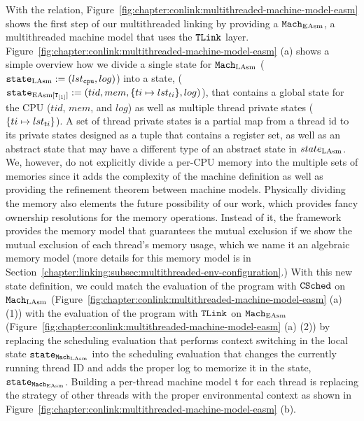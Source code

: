 With the relation, 
Figure~\ref{fig:chapter:conlink:multithreaded-machine-model-easm} shows
the first step of our multithreaded linking by providing 
a ${\mathrm{\texttt{Mach}}}_{\mathrm{EAsm}}$, a multithreaded machine model that uses the ${{\mathrm{\texttt{TLink}}}}$ layer.
Figure~\ref{fig:chapter:conlink:multithreaded-machine-model-easm} (a)
shows a simple overview how we divide a single state for ${\mathrm{\texttt{Mach}}}_{\mathrm{LAsm}}$  (${\mathrm{\texttt{state}}}_{\mathrm{LAsm}} := (lst_{{\mathrm{\texttt{cpu}}}}, log)$)
into a state, (${\mathrm{\texttt{state}}}_{\mathrm{EAsm}[{{\mathrm{\texttt{T}}}_{[1]}}]} := (tid, mem, \{ti \mapsto lst_{ti}\}, log)$),
that contains a global state for the CPU ($tid$, $mem$, and $log$) as well as 
multiple thread private states ($\{ti \mapsto lst_{ti}\}$).
A set of thread private states is a partial map from a thread id to its private states designed as a tuple that contains
a register set, as well as an abstract state that may have a different type of an abstract state in $state_{\mathrm{LAsm}}$. 
We, however, do not explicitly divide a per-CPU memory into the multiple sets of memories since 
it adds the complexity of the machine definition as well as providing the 
refinement theorem between machine models.
Physically dividing the memory also elements the future possibility of our work, which provides fancy ownership resolutions
for the memory operations.
Instead of it, the framework provides the memory model 
that guarantees the mutual exclusion if we show the mutual exclusion of each thread's memory usage, which we name it an algebraic memory model (more details for this memory model is in Section~\ref{chapter:linking:subsec:multithreaded-env-configuration}.)
With this new state definition, 
we could match the evaluation of the program with ${{\mathrm{\texttt{CSched}}}}$ on ${\mathrm{\texttt{Mach}}}_{\mathrm{LAsm}}$ (Figure~\ref{fig:chapter:conlink:multithreaded-machine-model-easm} (a) (1)) with  the evaluation of the program with ${{\mathrm{\texttt{TLink}}}}$ on ${\mathrm{\texttt{Mach}}}_{\mathrm{EAsm}}$
(Figure~\ref{fig:chapter:conlink:multithreaded-machine-model-easm} (a) (2)) 
by replacing the scheduling evaluation that performs context switching in the local state ${\mathrm{\texttt{state}}}_{{\mathrm{\texttt{Mach}}}_{\mathrm{LAsm}}}$
into  the scheduling evaluation that changes the currently running thread ID and 
adds the proper log to memorize it in the state, ${\mathrm{\texttt{state}}}_{{\mathrm{\texttt{Mach}}}_{\mathrm{EAsm}}}$.
Building a per-thread machine model t for each thread 
is replacing the strategy of other threads with the proper environmental context as shown in Figure~\ref{fig:chapter:conlink:multithreaded-machine-model-easm} (b).

